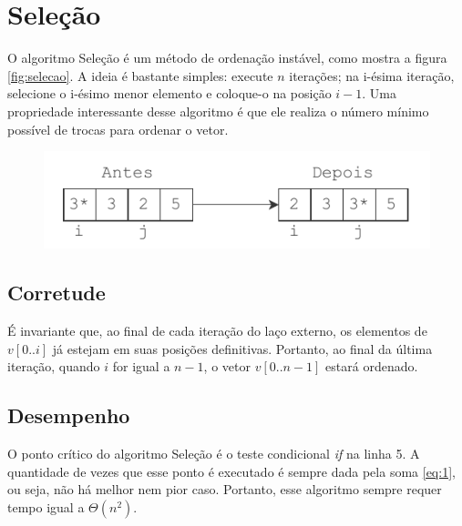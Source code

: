 \section{Seleção}
O algoritmo Seleção é um método de ordenação instável, como mostra a figura \ref{fig:selecao}. A ideia é bastante simples: execute $n$ iterações; na i-ésima iteração, selecione o i-ésimo menor elemento e coloque-o na posição $i - 1$. Uma propriedade interessante desse algoritmo é que ele realiza o número mínimo possível de trocas para ordenar o vetor.



\begin{figure}[H]
\centering
\includegraphics[scale=1.0]{figuras/pdf/selecao.pdf}
\end{figure}

\subsection*{Corretude}
É invariante que, ao final de cada iteração do laço externo, os elementos de $v[0..i]$ já estejam em suas posições definitivas. Portanto, ao final da última iteração, quando $i$ for igual a $n - 1$, o vetor $v[0..n - 1]$ estará ordenado.

\subsection*{Desempenho}
O ponto crítico do algoritmo Seleção é o teste condicional \textit{if} na linha 5. A quantidade de vezes que esse ponto é executado é sempre dada pela soma \ref{eq:1}, ou seja, não há melhor nem pior caso. Portanto, esse algoritmo sempre requer tempo igual a $\Theta(n^2)$.
